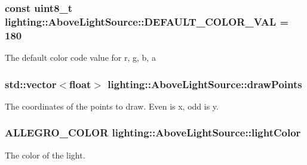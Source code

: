 \subsubsection[{\texorpdfstring{D\+E\+F\+A\+U\+L\+T\+\_\+\+C\+O\+L\+O\+R\+\_\+\+V\+AL}{DEFAULT_COLOR_VAL}}]{\setlength{\rightskip}{0pt plus 5cm}const uint8\+\_\+t lighting\+::\+Above\+Light\+Source\+::\+D\+E\+F\+A\+U\+L\+T\+\_\+\+C\+O\+L\+O\+R\+\_\+\+V\+AL = 180\hspace{0.3cm}{\ttfamily [static]}}\hypertarget{classlighting_1_1AboveLightSource_aa3134b6aa1f08719f50290094f014eb2}{}\label{classlighting_1_1AboveLightSource_aa3134b6aa1f08719f50290094f014eb2}


The default color code value for r, g, b, a 

\subsubsection[{\texorpdfstring{draw\+Points}{drawPoints}}]{\setlength{\rightskip}{0pt plus 5cm}std\+::vector$<$float$>$ lighting\+::\+Above\+Light\+Source\+::draw\+Points\hspace{0.3cm}{\ttfamily [protected]}}\hypertarget{classlighting_1_1AboveLightSource_a225b94f0f210561668b94e412c66443b}{}\label{classlighting_1_1AboveLightSource_a225b94f0f210561668b94e412c66443b}


The coordinates of the points to draw. Even is x, odd is y. 

\subsubsection[{\texorpdfstring{light\+Color}{lightColor}}]{\setlength{\rightskip}{0pt plus 5cm}A\+L\+L\+E\+G\+R\+O\+\_\+\+C\+O\+L\+OR lighting\+::\+Above\+Light\+Source\+::light\+Color\hspace{0.3cm}{\ttfamily [protected]}}\hypertarget{classlighting_1_1AboveLightSource_a67835e37619d5d86023ef1fbc315546b}{}\label{classlighting_1_1AboveLightSource_a67835e37619d5d86023ef1fbc315546b}


The color of the light. 

